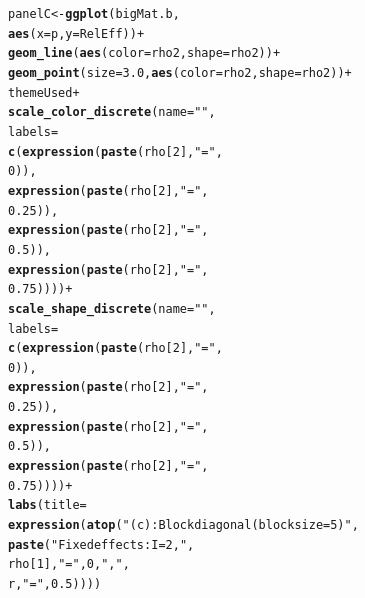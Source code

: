 \documentclass{article}\usepackage[]{graphicx}\usepackage[]{color}
\makeatletter
\newcommand{\hlnum}[1]{\textcolor[rgb]{0.686,0.059,0.569}{#1}}%
\newcommand{\hlstr}[1]{\textcolor[rgb]{0.192,0.494,0.8}{#1}}%
\newcommand{\hlopt}[1]{\textcolor[rgb]{0,0,0}{#1}}%
\newcommand{\hlstd}[1]{\textcolor[rgb]{0.345,0.345,0.345}{#1}}%
\newcommand{\hlkwb}[1]{\textcolor[rgb]{0.69,0.353,0.396}{#1}}%
\newcommand{\hlkwc}[1]{\textcolor[rgb]{0.333,0.667,0.333}{#1}}%
\newcommand{\hlkwd}[1]{\textcolor[rgb]{0.737,0.353,0.396}{\textbf{#1}}}%
\newenvironment{kframe}{%
 \def\at@end@of@kframe{}%
 \ifinner\ifhmode%
  \def\at@end@of@kframe{\end{minipage}}%
  \begin{minipage}{\columnwidth}%
 \fi\fi%
 \def\FrameCommand##1{\hskip\@totalleftmargin \hskip-\fboxsep
 \colorbox{shadecolor}{##1}\hskip-\fboxsep
     \hskip-\linewidth \hskip-\@totalleftmargin \hskip\columnwidth}%
 \MakeFramed {\advance\hsize-\width
   \@totalleftmargin\z@ \linewidth\hsize
   \@setminipage}}%
 {\par\unskip\endMakeFramed%
 \at@end@of@kframe}
\newenvironment{knitrout}{}{} %
\makeatother
\begin{document}
\begin{knitrout}
\color{fgcolor}\begin{kframe}
\begin{alltt}
\hlstd{panelC} \hlkwb{<-} \hlkwd{ggplot}\hlstd{(bigMat.b,}
                 \hlkwd{aes}\hlstd{(}\hlkwc{x}\hlstd{=p,} \hlkwc{y}\hlstd{=RelEff))}\hlopt{+}
  \hlkwd{geom_line}\hlstd{(}\hlkwd{aes}\hlstd{(}\hlkwc{color}\hlstd{=rho2,} \hlkwc{shape}\hlstd{=rho2))} \hlopt{+}
  \hlkwd{geom_point}\hlstd{(}\hlkwc{size}\hlstd{=}\hlnum{3.0}\hlstd{,} \hlkwd{aes}\hlstd{(}\hlkwc{color}\hlstd{=rho2,} \hlkwc{shape}\hlstd{=rho2))} \hlopt{+}
  \hlstd{themeUsed}\hlopt{+}
  \hlkwd{scale_color_discrete}\hlstd{(}\hlkwc{name} \hlstd{=} \hlstr{""}\hlstd{,}
                       \hlkwc{labels} \hlstd{=}
                         \hlkwd{c}\hlstd{(}\hlkwd{expression}\hlstd{(}\hlkwd{paste}\hlstd{(rho[}\hlnum{2}\hlstd{],} \hlstr{"="}\hlstd{,}
                                            \hlnum{0}\hlstd{)),}
                           \hlkwd{expression}\hlstd{(}\hlkwd{paste}\hlstd{(rho[}\hlnum{2}\hlstd{],} \hlstr{"="}\hlstd{,}
                                            \hlnum{0.25}\hlstd{)),}
                           \hlkwd{expression}\hlstd{(}\hlkwd{paste}\hlstd{(rho[}\hlnum{2}\hlstd{],} \hlstr{"="}\hlstd{,}
                                            \hlnum{0.5}\hlstd{)),}
                           \hlkwd{expression}\hlstd{(}\hlkwd{paste}\hlstd{(rho[}\hlnum{2}\hlstd{],} \hlstr{"="}\hlstd{,}
                                            \hlnum{0.75}\hlstd{))))} \hlopt{+}
  \hlkwd{scale_shape_discrete}\hlstd{(}\hlkwc{name} \hlstd{=} \hlstr{""}\hlstd{,}
                       \hlkwc{labels} \hlstd{=}
                         \hlkwd{c}\hlstd{(}\hlkwd{expression}\hlstd{(}\hlkwd{paste}\hlstd{(rho[}\hlnum{2}\hlstd{],} \hlstr{"="}\hlstd{,}
                                            \hlnum{0}\hlstd{)),}
                           \hlkwd{expression}\hlstd{(}\hlkwd{paste}\hlstd{(rho[}\hlnum{2}\hlstd{],} \hlstr{"="}\hlstd{,}
                                            \hlnum{0.25}\hlstd{)),}
                           \hlkwd{expression}\hlstd{(}\hlkwd{paste}\hlstd{(rho[}\hlnum{2}\hlstd{],} \hlstr{"="}\hlstd{,}
                                            \hlnum{0.5}\hlstd{)),}
                           \hlkwd{expression}\hlstd{(}\hlkwd{paste}\hlstd{(rho[}\hlnum{2}\hlstd{],} \hlstr{"="}\hlstd{,}
                                            \hlnum{0.75}\hlstd{))))} \hlopt{+}
  \hlkwd{labs}\hlstd{(}\hlkwc{title}\hlstd{=}
         \hlkwd{expression}\hlstd{(}\hlkwd{atop}\hlstd{(}\hlstr{"(c): Block diagonal (block size=5)"}\hlstd{,}
                         \hlkwd{paste}\hlstd{(}\hlstr{"Fixed effects: I = 2, "}\hlstd{,}
                               \hlstd{rho[}\hlnum{1}\hlstd{],} \hlstr{" = "}\hlstd{,} \hlnum{0}\hlstd{,} \hlstr{", "}\hlstd{,}
                               \hlstd{r,} \hlstr{" = "}\hlstd{,} \hlnum{0.5}\hlstd{))))}
\end{alltt}
\end{kframe}
\end{knitrout}
\end{document}
